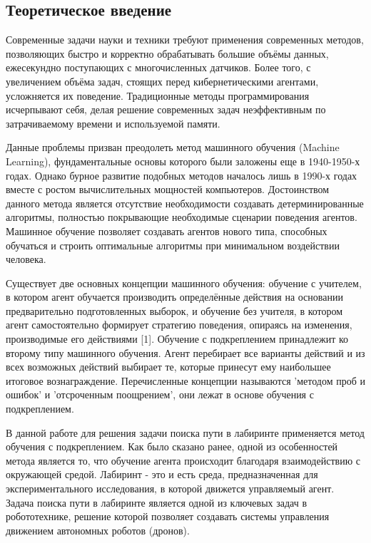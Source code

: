 \documentclass[a4paper]{report}
\theoremstyle{definition}
\theoremstyle{plain}
\theoremstyle{remark}
\theoremstyle{remark}
\theoremstyle{definition}
\begin{document}
\newpage
{}
\begin{center}
\section{Теоретическое введение}
\end{center}
\label{sec:W1}
Современные задачи науки и техники требуют применения современных методов, позволяющих быстро и корректно обрабатывать большие объёмы данных, ежесекундно поступающих с многочисленных датчиков. Более того, с увеличением объёма задач, стоящих перед кибернетическими агентами, усложняется их поведение. Традиционные методы программирования исчерпывают себя, делая решение современных задач неэффективным по затрачиваемому времени и используемой памяти.

Данные проблемы призван преодолеть метод машинного обучения (Machine Learning), фундаментальные основы которого были заложены еще в 1940-1950-х годах. Однако бурное развитие подобных методов началось лишь в 1990-х годах вместе с ростом вычислительных мощностей компьютеров.
Достоинством данного метода является отсутствие необходимости создавать детерминированные алгоритмы, полностью покрывающие необходимые сценарии поведения агентов. Машинное обучение позволяет создавать агентов нового типа, способных обучаться и строить оптимальные алгоритмы при минимальном воздействии человека.

Существует две основных концепции машинного обучения: обучение с учителем, в котором агент обучается производить определённые действия на основании предварительно подготовленных выборок, и обучение без учителя, в котором агент самостоятельно формирует стратегию поведения, опираясь на изменения, производимые его действиями [1]. Обучение с подкреплением принадлежит ко второму типу машинного обучения. Агент перебирает все варианты действий и из всех возможных действий выбирает те, которые принесут ему наибольшее итоговое вознаграждение. Перечисленные концепции называются 'методом проб и ошибок' и 'отсроченным поощрением', они лежат в основе обучения с подкреплением.

В данной работе для решения задачи поиска пути в лабиринте применяется метод обучения с подкреплением. Как было сказано ранее, одной из особенностей метода является то, что обучение агента происходит благодаря взаимодействию с окружающей средой. Лабиринт - это и есть среда, предназначенная для экспериментального исследования, в которой движется управляемый агент. Задача поиска пути в лабиринте является одной из ключевых задач в робототехнике, решение которой позволяет создавать системы управления движением автономных роботов (дронов).
\end{document}
